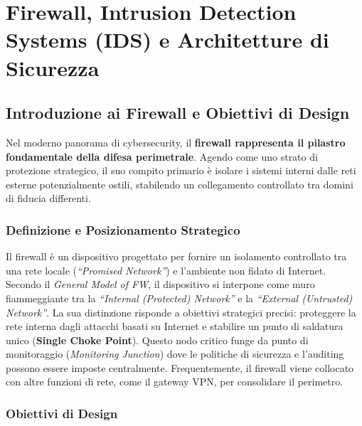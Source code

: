 ﻿\section{Firewall, Intrusion Detection Systems (IDS) e Architetture di Sicurezza}

\subsection{Introduzione ai Firewall e Obiettivi di Design}

Nel moderno panorama di cybersecurity, il
\textbf{firewall rappresenta il pilastro fondamentale della difesa
perimetrale}. Agendo come uno strato di protezione strategico, il suo
compito primario è isolare i sistemi interni dalle reti esterne
potenzialmente ostili, stabilendo un collegamento controllato tra domini
di fiducia differenti.

\subsubsection{Definizione e Posizionamento Strategico}

Il firewall è un dispositivo progettato per fornire un isolamento
controllato tra una rete locale (\textit{``Promised Network''}) e
l'ambiente non fidato di Internet. Secondo il \textit{General Model of
FW}, il dispositivo si interpone come muro fiammeggiante tra la
\textit{``Internal (Protected) Network''} e la \textit{``External
(Untrusted) Network''}. La sua distinzione risponde a obiettivi
strategici precisi: proteggere la rete interna dagli attacchi basati su
Internet e stabilire un punto di saldatura unico (\textbf{Single Choke
Point}). Questo nodo critico funge da punto di monitoraggio
(\textit{Monitoring Junction}) dove le politiche di sicurezza e
l'auditing possono essere imposte centralmente. Frequentemente, il
firewall viene collocato con altre funzioni di rete, come il gateway
VPN, per consolidare il perimetro.

\subsubsection{Obiettivi di Design}

